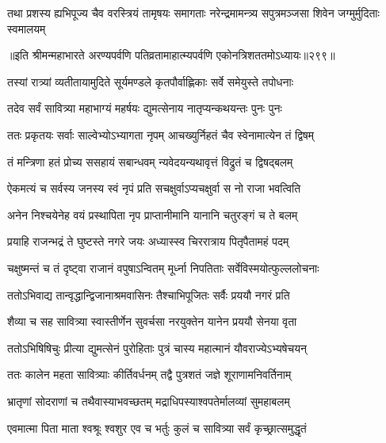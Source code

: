 \begin{center}



\fourlineindentedshloka
{तथा प्रशस्य ह्यभिपूज्य चैव}
{वरस्त्रियं तामृषयः समागताः}
{नरेन्द्रमामन्त्र्य सपुत्रमञ्जसा}
{शिवेन जग्मुर्मुदिताः स्वमालयम्}


॥इति श्रीमन्महाभारते अरण्यपर्वणि
पतिव्रतामाहात्म्यपर्वणि एकोनत्रिशततमोऽध्यायः॥२९९॥




\twolineshloka
{तस्यां रात्र्यां व्यतीतायामुदिते सूर्यमण्डले}
{कृतपौर्वाह्णिकाः सर्वे समेयुस्ते तपोधनाः}


\twolineshloka
{तदेव सर्वं सावित्र्या महाभाग्यं महर्षयः}
{द्युमत्सेनाय नातृप्यन्कथयन्तः पुनः पुनः}


\twolineshloka
{ततः प्रकृतयः सर्वाः साल्वेभ्योऽभ्यागता नृपम्}
{आचख्युर्निहतं चैव स्वेनामात्येन तं द्विषम्}


\twolineshloka
{तं मन्त्रिणा हतं प्रोच्य ससहायं सबान्धवम्}
{न्यवेदयन्यथावृत्तं विद्रुतं च द्विषद्बलम्}


\twolineshloka
{ऐकमत्यं च सर्वस्य जनस्य स्वं नृपं प्रति}
{सचक्षुर्वाऽप्यचक्षुर्वा स नो राजा भवत्विति}


\twolineshloka
{अनेन निश्चयेनेह वयं प्रस्थापिता नृप}
{प्राप्तानीमानि यानानि चतुरङ्गं च ते बलम्}


\twolineshloka
{प्रयाहि राजन्भद्रं ते घुष्टस्ते नगरे जयः}
{अध्यास्स्व चिररात्राय पितृपैतामहं पदम्}




\twolineshloka
{चक्षुष्मन्तं च तं दृष्ट्वा राजानं वपुषाऽन्वितम्}
{मूर्ध्ना निपतिताः सर्वेविस्मयोत्फुल्ललोचनाः}


\twolineshloka
{ततोऽभिवाद्य तान्वृद्धान्द्विजानाश्रमवासिनः}
{तैश्चाभिपूजितः सर्वैः प्रययौ नगरं प्रति}


\twolineshloka
{शैव्या च सह सावित्र्या स्वास्तीर्णेन सुवर्चसा}
{नरयुक्तेन यानेन प्रययौ सेनया वृता}


\twolineshloka
{ततोऽभिषिषिचुः प्रीत्या द्युमत्सेनं पुरोहिताः}
{पुत्रं चास्य महात्मानं यौवराज्येऽभ्यषेचयन्}


\twolineshloka
{ततः कालेन महता सावित्र्याः कीर्तिवर्धनम्}
{तद्वै पुत्रशतं जज्ञे शूराणामनिवर्तिनाम्}


\twolineshloka
{भ्रातृणां सोदराणां च तथैवास्याभवच्छतम्}
{मद्राधिपस्याश्वपतेर्मालव्यां सुमहाबलम्}


\twolineshloka
{एवमात्मा पिता माता श्वश्रूः श्वशुर एव च}
{भर्तुः कुलं च सावित्र्या सर्वं कृच्छ्रात्समुद्धृतं}



\end{center}
